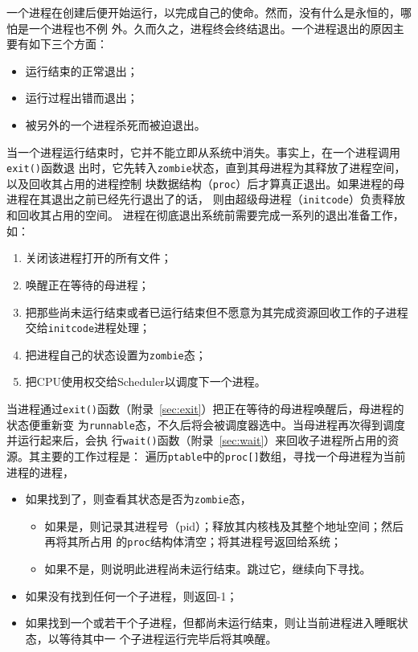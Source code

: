 \documentclass{swfuthesism}
\begin{document}
一个进程在创建后便开始运行，以完成自己的使命。然而，没有什么是永恒的，哪怕是一个进程也不例
外。久而久之，进程终会终结退出。一个进程退出的原因主要有如下三个方面：
\begin{itemize}
\item 运行结束的正常退出；
\item 运行过程出错而退出；
\item 被另外的一个进程杀死而被迫退出。
\end{itemize}

当一个进程运行结束时，它并不能立即从系统中消失。事实上，在一个进程调用\texttt{exit()}函数退
出时，它先转入\texttt{zombie}状态，直到其母进程为其释放了进程空间，以及回收其占用的进程控制
块数据结构（\texttt{proc}）后才算真正退出。如果进程的母进程在其退出之前已经先行退出了的话，
则由超级母进程（\texttt{initcode}）负责释放和回收其占用的空间\cite{ArpaciDusseau14-Book}。
进程在彻底退出系统前需要完成一系列的退出准备工作\cite{mauerer2008professional}，如：
\begin{enumerate}
\item 关闭该进程打开的所有文件；
\item 唤醒正在等待的母进程；
\item 把那些尚未运行结束或者已运行结束但不愿意为其完成资源回收工作的子进程交给\texttt{initcode}进程处理；
\item 把进程自己的状态设置为\texttt{zombie}态；
\item 把CPU使用权交给Scheduler以调度下一个进程。
\end{enumerate}

当进程通过\texttt{exit()}函数（附录~\ref{sec:exit}）把正在等待的母进程唤醒后，母进程的状态便重新变
为\texttt{runnable}态，不久后将会被调度器选中。当母进程再次得到调度并运行起来后，会执
行\texttt{wait()}函数（附录~\ref{sec:wait}）来回收子进程所占用的资源。其主要的工作过程是：
遍历\texttt{ptable}中的\texttt{proc[]}数组，寻找一个母进程为当前进程的进程，
\begin{itemize}
\item 如果找到了，则查看其状态是否为\texttt{zombie}态，
  \begin{itemize}
  \item 如果是，则记录其进程号（pid）；释放其内核栈及其整个地址空间；然后再将其所占用
    的\texttt{proc}结构体清空；将其进程号返回给系统；
  \item 如果不是，则说明此进程尚未运行结束。跳过它，继续向下寻找。
  \end{itemize}    
\item 如果没有找到任何一个子进程，则返回-1；
\item 如果找到一个或若干个子进程，但都尚未运行结束，则让当前进程进入睡眠状态，以等待其中一
  个子进程运行完毕后将其唤醒。
\end{itemize}
\end{document}
